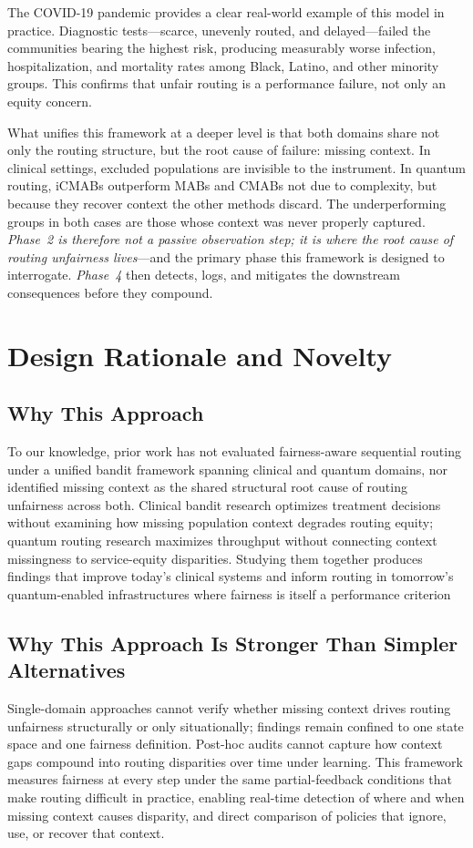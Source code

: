 \documentclass{IEEEtran}
\begin{document}
The COVID-19 pandemic provides a clear real-world example of this model in
practice. Diagnostic tests---scarce, unevenly routed, and delayed---failed
the communities bearing the highest risk, producing measurably worse
infection, hospitalization, and mortality rates among Black, Latino, and
other minority groups. This confirms that unfair routing is a performance
failure, not only an equity concern.

What unifies this framework at a deeper level is that both domains share
not only the routing structure, but the root cause of failure: missing
context. In clinical settings, excluded populations are invisible to the
instrument. In quantum routing, iCMABs outperform MABs and CMABs not due to
complexity, but because they recover context the other methods discard. The
underperforming groups in both cases are those whose context was never
properly captured. \textit{Phase~2 is therefore not a passive observation
step; it is where the root cause of routing unfairness lives}---and the
primary phase this framework is designed to interrogate. \textit{Phase~4} then
detects, logs, and mitigates the downstream consequences before they compound.

\section{Design Rationale and Novelty}

\subsection{Why This Approach}
To our knowledge, prior work has not evaluated fairness-aware sequential
routing under a unified bandit framework spanning clinical and quantum
domains, nor identified missing context as the shared structural root cause
of routing unfairness across both. Clinical bandit research optimizes
treatment decisions without examining how missing population context degrades
routing equity; quantum routing research maximizes throughput without
connecting context missingness to service-equity disparities. Studying them
together produces findings that improve today's clinical systems and inform 
routing in tomorrow's quantum-enabled infrastructures where fairness is itself 
a performance criterion

\subsection{Why This Approach Is Stronger Than Simpler Alternatives}
Single-domain approaches cannot verify whether missing context drives routing
unfairness structurally or only situationally; findings remain confined to
one state space and one fairness definition. Post-hoc audits cannot capture
how context gaps compound into routing disparities over time under learning.
This framework measures fairness at every step under the same partial-feedback
conditions that make routing difficult in practice, enabling real-time
detection of where and when missing context causes disparity, and direct
comparison of policies that ignore, use, or recover that context.
\end{document}
